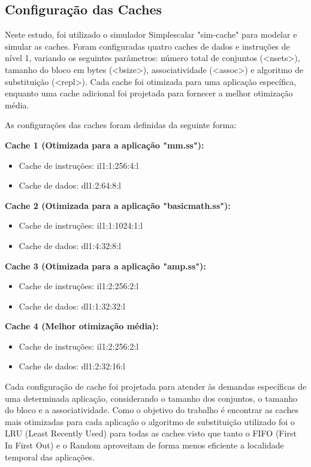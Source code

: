 \documentclass[12pt]{article}
\begin{document}
\subsection{Configuração das Caches}
Neste estudo, foi utilizado o simulador Simplescalar "sim-cache" para modelar e simular as caches. Foram configuradas quatro caches de dados e instruções de nível 1, variando os seguintes parâmetros: número total de conjuntos (\textless nsets\textgreater), tamanho do bloco em bytes (\textless bsize\textgreater), associatividade (\textless assoc\textgreater) e algoritmo de substituição (\textless repl\textgreater). Cada cache foi otimizada para uma aplicação específica, enquanto uma cache adicional foi projetada para fornecer a melhor otimização média.

As configurações das caches foram definidas da seguinte forma:

\textbf{Cache 1 (Otimizada para a aplicação "mm.ss"):}
\begin{itemize}
\item Cache de instruções: il1:1:256:4:l
\item Cache de dados: dl1:2:64:8:l
\end{itemize}

\textbf{Cache 2 (Otimizada para a aplicação "basicmath.ss"):}
\begin{itemize}
\item Cache de instruções: il1:1:1024:1:l
\item Cache de dados: dl1:4:32:8:l
\end{itemize}

\textbf{Cache 3 (Otimizada para a aplicação "amp.ss"):}
\begin{itemize}
\item Cache de instruções: il1:2:256:2:l
\item Cache de dados: dl1:1:32:32:l
\end{itemize}

\textbf{Cache 4 (Melhor otimização média):}
\begin{itemize}
\item Cache de instruções: il1:2:256:2:l
\item Cache de dados: dl1:2:32:16:l
\end{itemize}

Cada configuração de cache foi projetada para atender às demandas específicas de uma determinada aplicação, considerando o tamanho dos conjuntos, o tamanho do bloco e a associatividade. Como o objetivo do trabalho é encontrar as caches mais otimizadas para cada aplicação o algoritmo de substituição utilizado foi o LRU (Least Recently Used) para todas as caches visto que tanto o FIFO (First In First Out) e o Random aproveitam de forma menos eficiente a localidade temporal das aplicações.
\end{document}
